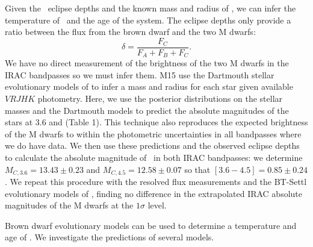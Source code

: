 Given the \spitz\ eclipse depths and the known mass and radius of \LC, 
we can infer the temperature of \LC\ and the age of the system. 
The eclipse depths only provide a ratio between the flux
from the brown dwarf and the two M dwarfs:
\begin{equation}
\delta = \frac{F_C}{F_A + F_B + F_C}.
\end{equation}
We have no direct measurement of the brightness of the two M dwarfs in the
IRAC bandpasses so we must infer them.
M15 use the Dartmouth stellar evolutionary models of \citet{Dotter08}
to infer a mass and radius for each star given available $VRJHK$ photometry.
Here, we use the posterior distributions on the stellar masses and the Dartmouth models to predict
the absolute magnitudes of the stars at 3.6 and \irb (Table 1).
This technique also reproduces the expected brightness of the M dwarfs to within the
photometric uncertainties in all bandpasses where we do have data.
We then use these predictions and the observed eclipse depths to 
calculate the absolute magnitude of \LC\ in 
both IRAC bandpasses: we determine $M_{C, 3.6} = 13.43 \pm 0.23$ and 
$M_{C, 4.5} = 12.58 \pm 0.07$ so that $[3.6 - 4.5] = 0.85 \pm 0.24$.
We repeat this procedure with the resolved flux measurements and the BT-Settl
evolutionary models of \citet{Allard12}, finding no difference in the 
extrapolated IRAC absolute magnitudes of the M dwarfs at the $1\sigma$ level.


Brown dwarf evolutionary models can be used to determine a temperature
and age of \LC.
We investigate the predictions of several models.



